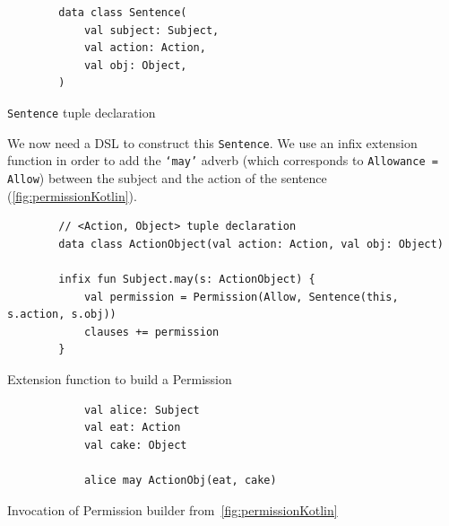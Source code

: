 \begin{listing}[h]
    \centering
    \begin{minipage}{0.4\textwidth}
        \begin{verbatim}
        data class Sentence(
            val subject: Subject,
            val action: Action,
            val obj: Object,
        )
        \end{verbatim}
    \end{minipage}
    \caption{\texttt{Sentence} tuple declaration}\label{fig:kotlinSentence}
\end{listing}

We now need a DSL to construct this \texttt{Sentence}.
We use an infix extension function in order to add the \texttt{`may'} adverb (which corresponds to \texttt{Allowance = Allow}) between the subject and the action of the sentence (\autoref{fig:permissionKotlin}).

\begin{listing}[h]
    \centering
    \begin{minipage}{\textwidth}
        \begin{verbatim}
        // <Action, Object> tuple declaration
        data class ActionObject(val action: Action, val obj: Object)

        infix fun Subject.may(s: ActionObject) {
            val permission = Permission(Allow, Sentence(this, s.action, s.obj))
            clauses += permission
        }
        \end{verbatim}
    \end{minipage}
    \caption{Extension function to build a Permission}\label{fig:permissionKotlin}
\end{listing}



\begin{listing}[h]
    \centering
    \begin{minipage}{0.5\textwidth}
        \begin{verbatim}
            val alice: Subject
            val eat: Action
            val cake: Object

            alice may ActionObj(eat, cake)
        \end{verbatim}
    \end{minipage}
    \caption{Invocation of Permission builder from~\autoref{fig:permissionKotlin}}
    \label{fig:permissionUse}
\end{listing}

